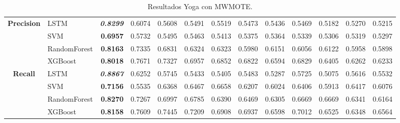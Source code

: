 \begin{table}[H]
\begin{adjustbox}{max width=12cm}
\begin{tabular}{|c|l|r|r|r|r|r|r|r|r|r|r|r|}
			\hline
			\textbf{Precision} &  LSTM & \textit{ \textbf{  0.8299 } } &  0.6074 &  0.5608 &  0.5491 &  0.5519 &  0.5473 &  0.5436 &  0.5469 &  0.5182 &  0.5270 &  0.5215 \\
			&  SVM & \textbf{  0.6957 } &  0.5732 &  0.5495 &  0.5463 &  0.5413 &  0.5375 &  0.5364 &  0.5339 &  0.5306 &  0.5319 &  0.5297 \\
			&  RandomForest & \textbf{  0.8163 } &  0.7335 &  0.6831 &  0.6324 &  0.6323 &  0.5980 &  0.6151 &  0.6056 &  0.6122 &  0.5958 &  0.5898 \\
			&  XGBoost & \textbf{  0.8018 } &  0.7671 &  0.7327 &  0.6957 &  0.6852 &  0.6822 &  0.6594 &  0.6829 &  0.6405 &  0.6262 &  0.6233 \\
			\hline
			\textbf{Recall} &  LSTM & \textit{ \textbf{  0.8867 } } &  0.6252 &  0.5745 &  0.5433 &  0.5405 &  0.5483 &  0.5287 &  0.5725 &  0.5075 &  0.5616 &  0.5532 \\
			&  SVM & \textbf{  0.7156 } &  0.5535 &  0.6368 &  0.6467 &  0.6658 &  0.6207 &  0.6024 &  0.6406 &  0.5913 &  0.6417 &  0.6076 \\
			&  RandomForest & \textbf{  0.8270 } &  0.7267 &  0.6997 &  0.6785 &  0.6390 &  0.6469 &  0.6305 &  0.6669 &  0.6669 &  0.6341 &  0.6164 \\
			&  XGBoost & \textbf{  0.8158 } &  0.7609 &  0.7445 &  0.7209 &  0.6908 &  0.6937 &  0.6598 &  0.7012 &  0.6525 &  0.6348 &  0.6564 \\
			\hline
		\end{tabular}
	\end{adjustbox}
	\caption{Resultados Yoga con MWMOTE.}
	\label{tab:Yoga_MWMOTE}
\end{table}

